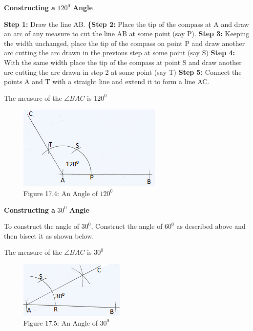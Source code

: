 \documentclass[
  a4paperpaper,
]{scrbook}
\begin{document}
\textbf{Constructing a} \(120^0\) \textbf{Angle}

\textbf{Step 1:} Draw the line AB. \textbf{\{Step 2:} Place the tip of
the compass at A and draw an arc of any measure to cut the line AB at
some point (say P). \textbf{Step 3:} Keeping the width unchanged, place
the tip of the compass on point P and draw another arc cutting the arc
drawn in the previous step at some point (say S) \textbf{Step 4:} With
the same width place the tip of the compass at point S and draw another
arc cutting the arc drawn in step 2 at some point (say T) \textbf{Step
5:} Connect the points A and T with a straight line and extend it to
form a line AC.

The measure of the \(\angle BAC\) is \(120^0\)

\begin{figure}

{\centering \includegraphics{figures/Images/FIG4.png}

}

\caption{Figure 17.4: An Angle of \(120^0\)}

\end{figure}

\textbf{Constructing a} \(30^0\) \textbf{Angle}

To construct the angle of \(30^0\), Construct the angle of \(60^0\) as
described above and then bisect it as shown below.

The measure of the \(\angle BAC\) is \(30^0\)

\begin{figure}

{\centering \includegraphics{figures/Images/FIG5.png}

}

\caption{Figure 17.5: An Angle of \(30^0\)}

\end{figure}
\end{document}
